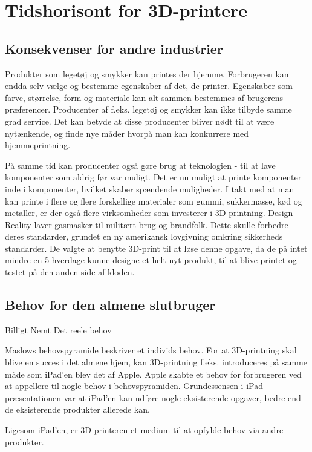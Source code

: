 
\chapter{Tidshorisont for 3D-printere}
\section{Konsekvenser for andre industrier}


Produkter som legetøj og smykker kan printes der hjemme. Forbrugeren kan endda selv vælge og bestemme egenskaber af det, de printer. Egenskaber som farve, størrelse, form og materiale kan alt sammen bestemmes af brugerens præferencer. Producenter af f.eks. legetøj og smykker kan ikke tilbyde samme grad service. Det kan betyde at disse producenter bliver nødt til at være nytænkende, og finde nye måder hvorpå man kan konkurrere med hjemmeprintning.

På samme tid kan producenter også gøre brug at teknologien -{} til at lave komponenter som aldrig før var muligt. Det er nu muligt at printe komponenter inde i komponenter, hvilket skaber spændende muligheder.
I takt med at man kan printe i flere og flere forskellige materialer som gummi, sukkermasse, kød og metaller, er der også flere virksomheder som investerer i 3D-printning.
Design Reality laver gasmasker til militært brug og brandfolk. Dette skulle forbedre deres standarder, grundet en ny amerikansk lovgivning omkring sikkerheds standarder. De valgte at benytte 3D-print til at løse denne opgave, da de på intet mindre en 5 hverdage kunne designe et helt nyt produkt, til at blive printet og testet på den anden side af kloden. \cite{3ders.org_design_2013}





\section{Behov for den almene slutbruger}

Billigt
Nemt
Det reele behov


Maslows behovspyramide \cite{abraham_harold_maslow_theory_1943} beskriver et individs behov. For at 3D-printning skal blive en succes i det almene hjem, kan 3D-printning f.eks. introduceres på samme måde som iPad'en blev det af Apple. Apple skabte et behov for forbrugeren ved at appellere til nogle behov i behovspyramiden. Grundessensen i iPad præsentationen var at iPad'en kan udføre nogle eksisterende opgaver, bedre end de eksisterende produkter allerede kan.

Ligesom iPad'en, er 3D-printeren et medium til at opfylde behov via andre produkter. 